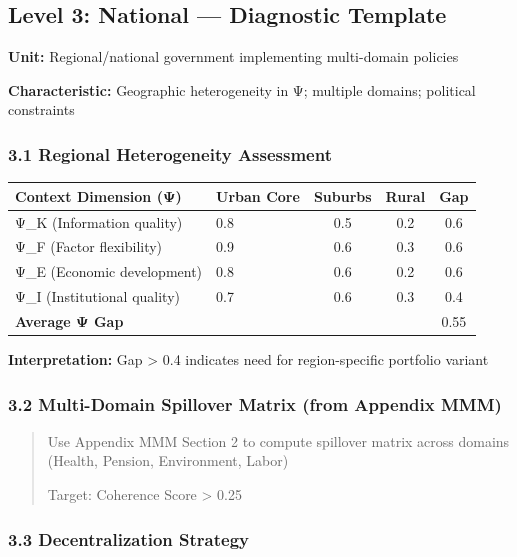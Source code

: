 \subsection*{Level 3: National --- Diagnostic Template}

\textbf{Unit:} Regional/national government implementing multi-domain policies

\textbf{Characteristic:} Geographic heterogeneity in Ψ; multiple domains; political constraints

\subsubsection*{3.1 Regional Heterogeneity Assessment}

\begin{center}
\small
\begin{tabular}{@{}llccc@{}}
\toprule
\textbf{Context Dimension (Ψ)} & \textbf{Urban Core} & \textbf{Suburbs} & \textbf{Rural} & \textbf{Gap} \\
\midrule
Ψ\_K (Information quality) & 0.8 & 0.5 & 0.2 & 0.6 \\
Ψ\_F (Factor flexibility) & 0.9 & 0.6 & 0.3 & 0.6 \\
Ψ\_E (Economic development) & 0.8 & 0.6 & 0.2 & 0.6 \\
Ψ\_I (Institutional quality) & 0.7 & 0.6 & 0.3 & 0.4 \\
\midrule
\textbf{Average Ψ Gap} & & & & 0.55 \\
\midrule
\end{tabular}
\end{center}

\textbf{Interpretation:} Gap > 0.4 indicates need for region-specific portfolio variant

\subsubsection*{3.2 Multi-Domain Spillover Matrix (from Appendix MMM)}

\begin{quote}
Use Appendix MMM Section 2 to compute spillover matrix across domains (Health, Pension, Environment, Labor)

Target: Coherence Score > 0.25
\end{quote}

\subsubsection*{3.3 Decentralization Strategy}

